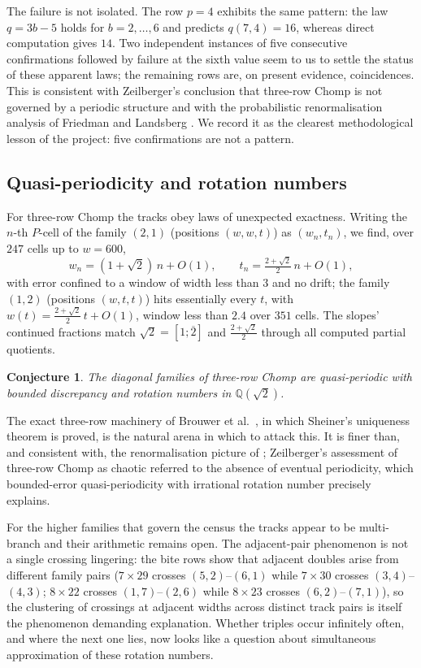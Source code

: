 \documentclass[11pt]{article}
\newtheorem{conjecture}[theorem]{Conjecture}
\theoremstyle{definition}
\begin{document}
The failure is not isolated. The row $p=4$ exhibits the same pattern: the law
$q=3b-5$ holds for $b=2,\dots,6$ and predicts $q(7,4)=16$, whereas direct
computation gives $14$. Two independent instances of five consecutive
confirmations followed by failure at the sixth value seem to us to settle the
status of these apparent laws; the remaining rows are, on present evidence,
coincidences. This is consistent with Zeilberger's conclusion
that three-row Chomp is not governed by a periodic structure \cite{Zchaos} and
with the probabilistic renormalisation analysis of Friedman and Landsberg
\cite{FL}. We record it as the clearest methodological lesson of the project:
five confirmations are not a pattern.

\subsection{Quasi-periodicity and rotation numbers}

For three-row Chomp the tracks obey laws of unexpected exactness. Writing the
$n$-th $P$-cell of the family $(2,1)$ (positions $(w,w,t)$) as $(w_n,t_n)$, we
find, over $247$ cells up to $w=600$,
\[
  w_n=(1+\sqrt2)\,n+O(1),\qquad t_n=\tfrac{2+\sqrt2}{2}\,n+O(1),
\]
with error confined to a window of width less than $3$ and no drift; the family
$(1,2)$ (positions $(w,t,t)$) hits essentially every $t$, with
$w(t)=\tfrac{2+\sqrt2}{2}\,t+O(1)$, window less than $2.4$ over $351$ cells.
The slopes' continued fractions match $\sqrt2=[1;\overline2]$ and
$\tfrac{2+\sqrt2}{2}$ through all computed partial quotients.

\begin{conjecture}
The diagonal families of three-row Chomp are quasi-periodic with bounded
discrepancy and rotation numbers in $\mathbb{Q}(\sqrt2)$.
\end{conjecture}

The exact three-row machinery of Brouwer et al.\ \cite{BHMS}, in which
Sheiner's uniqueness theorem \cite{Sheiner} is proved, is the natural arena in
which to attack this. It is finer than, and consistent with, the
renormalisation picture of \cite{FL}; Zeilberger's assessment of three-row
Chomp as chaotic \cite{Zchaos} referred to the absence of eventual
periodicity, which bounded-error quasi-periodicity with irrational rotation
number precisely explains.

For the higher families that govern the census the tracks appear to be
multi-branch and their arithmetic remains open. The adjacent-pair phenomenon is
not a single crossing lingering: the bite rows show that adjacent doubles arise
from different family pairs ($7\times29$ crosses $(5,2)$--$(6,1)$ while
$7\times30$ crosses $(3,4)$--$(4,3)$; $8\times22$ crosses $(1,7)$--$(2,6)$
while $8\times23$ crosses $(6,2)$--$(7,1)$), so the clustering of crossings at
adjacent widths across distinct track pairs is itself the phenomenon demanding
explanation. Whether triples occur infinitely often, and where the next one
lies, now looks like a question about simultaneous approximation of these
rotation numbers.
\end{document}
